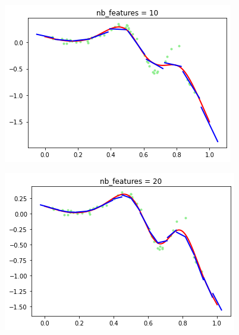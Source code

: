 \documentclass[french,12pt]{article}
\begin{document}
\begin{figure}[ht]
\centering
\begin{minipage}{.45\textwidth}
	\centering
	\includegraphics[width=\textwidth]{lwr_nfeat_10.png}
	\label{fig:lwr_nfeat_10}
\end{minipage}
\hfill
\begin{minipage}{.45\textwidth}
	\centering
	\includegraphics[width=\textwidth]{lwr_nfeat_20.png}
	\label{fig:lwr_nfeat_20}
\end{minipage}
\begin{minipage}{.45\textwidth}
	\centering

\end{minipage}
\end{figure}
\end{document}
